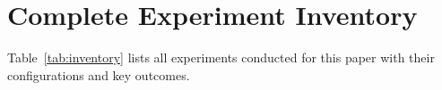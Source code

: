 \documentclass{article}
\begin{document}





\appendix

\section{Complete Experiment Inventory}
\label{app:inventory}

Table~\ref{tab:inventory} lists all experiments conducted for this paper with their configurations and key outcomes.
\end{document}
